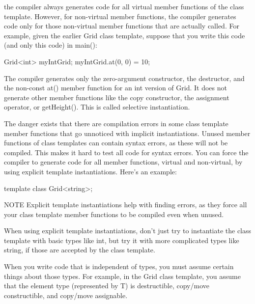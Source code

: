 the compiler always generates code for all virtual member functions of the class template. However, for non-virtual member functions, the compiler generates code only for those non-virtual member functions that are actually called. For example, given the earlier Grid class template, suppose that you write this code (and only this code) in main():

\begin{cpp}
Grid<int> myIntGrid;
myIntGrid.at(0, 0) = 10;
\end{cpp}

The compiler generates only the zero-argument constructor, the destructor, and the non-const at() member function for an int version of Grid. It does not generate other member functions like the copy constructor, the assignment operator, or getHeight(). This is called selective instantiation.



The danger exists that there are compilation errors in some class template member functions that go unnoticed with implicit instantiations. Unused member functions of class templates can contain syntax errors, as these will not be compiled. This makes it hard to test all code for syntax errors. You can force the compiler to generate code for all member functions, virtual and non-virtual, by using explicit template instantiations. Here’s an example:

\begin{cpp}
template class Grid<string>;
\end{cpp}

\begin{myNotic}{NOTE}
Explicit template instantiations help with finding errors, as they force all your class template member functions to be compiled even when unused.
\end{myNotic}

When using explicit template instantiations, don’t just try to instantiate the class template with basic types like int, but try it with more complicated types like string, if those are accepted by the class template.


When you write code that is independent of types, you must assume certain things about those types. For example, in the Grid class template, you assume that the element type (represented by T) is destructible, copy/move constructible, and copy/move assignable.


